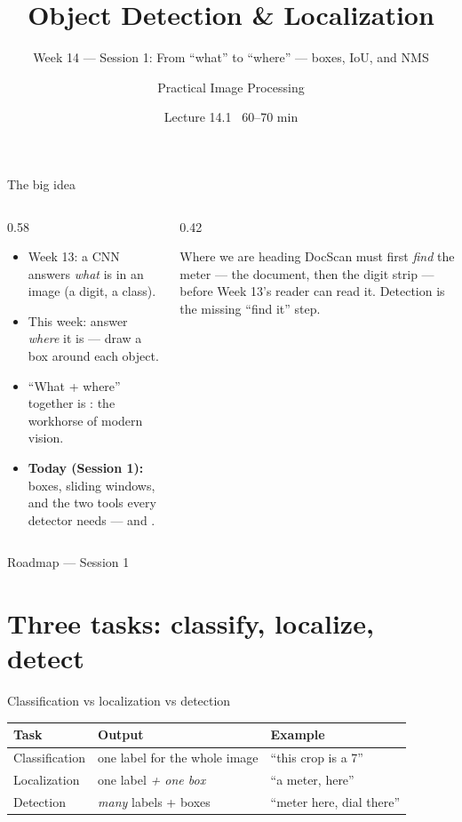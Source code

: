 \documentclass[10pt,aspectratio=169]{beamer}
\title{Object Detection \& Localization}
\subtitle{Week 14 — Session 1: From ``what'' to ``where'' --- boxes, IoU, and NMS}
\author{Practical Image Processing}
\date{Lecture 14.1 \textbullet\ 60--70 min}
\begin{document}
\maketitle

\begin{frame}{The big idea}
  \begin{columns}[T]
    \begin{column}{0.58\textwidth}
      \begin{itemize}
        \item Week 13: a CNN answers \emph{what} is in an image (a digit, a class).
        \item \alert{This week:} answer \emph{where} it is --- draw a box around each object.
        \item ``What + where'' together is : the workhorse of modern vision.
        \item \textbf{Today (Session 1):} boxes, sliding windows, and the two tools every detector needs ---  and .
      \end{itemize}
    \end{column}
    \begin{column}{0.42\textwidth}
      \begin{alertblock}{Where we are heading}
        DocScan must first \emph{find} the meter --- the document, then the digit strip --- before Week 13's reader can read it. Detection is the missing ``find it'' step.
      \end{alertblock}
    \end{column}
  \end{columns}
\end{frame}

\begin{frame}{Roadmap --- Session 1}\tableofcontents\end{frame}

\section{Three tasks: classify, localize, detect}

\begin{frame}{Classification vs localization vs detection}
  \begin{center}
  \begin{tabular}{@{}lll@{}}
    \toprule
    \textbf{Task} & \textbf{Output} & \textbf{Example} \\
    \midrule
    Classification & one label for the whole image & ``this crop is a 7'' \\
    Localization & one label \emph{+ one box} & ``a meter, here'' \\
    Detection & \emph{many} labels + boxes & ``meter here, dial there'' \\
    \bottomrule
  \end{tabular}
  \end{center}
\end{frame}
\end{document}
